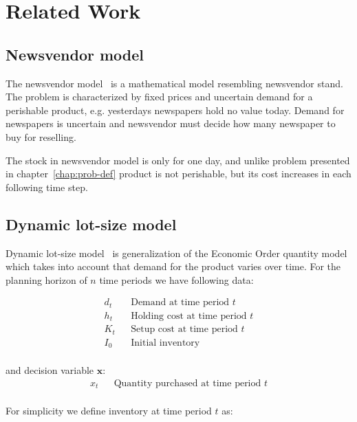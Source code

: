 
\chapter{Related Work}
\label{chap:Related Work}

\section{Newsvendor model}
\label{sec:Newsvendor model}

The newsvendor model~\autocite{Arrow1974} is a mathematical model resembling newsvendor stand. The problem is characterized by fixed prices and uncertain demand for a perishable product, e.g. yesterdays newspapers hold no value today. Demand for newspapers is uncertain and newsvendor must decide how many newspaper to buy for reselling.


The stock in newsvendor model is only for one day, and unlike problem presented in chapter~\ref{chap:prob-def} product is not perishable, but its cost increases in each following time step.

\section{Dynamic lot-size model}
\label{sec:Dynamic lot-size model}

Dynamic lot-size model~\autocite{Wagner2004} is generalization of the Economic Order quantity model~\autocite{Harris1990} which takes into account that demand for the product varies over time. For the planning horizon of $n$ time periods we have following data:

\begin{align*}
  d_t && \text{Demand at time period $t$} \\
  h_t && \text{Holding cost at time period $t$} \\
  K_t && \text{Setup cost at time period $t$} \\
  I_0 && \text{Initial inventory} \\
\end{align*}

and decision variable $\mathbf{x}$:
\begin{align*}
  x_t && \text{Quantity purchased at time period $t$}\\
\end{align*}

For simplicity we define inventory at time period $t$ as:

